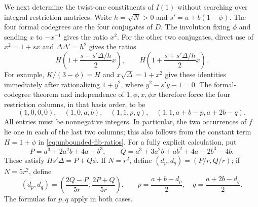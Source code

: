 We next determine the twist-one constituents of $I(1)$ without searching
over integral restriction matrices. Write $h=\sqrt N>0$ and
$s'=a+b(1-\phi)$. The four formal codegrees are the four conjugates of
$D$. The involution fixing $\phi$ and sending $x$ to $-x^{-1}$ gives
the ratio $x^2$. For the other two conjugates, direct use of
$x^2=1+sx$ and $\Delta\Delta'=h^2$ gives the ratios
\begin{equation}\label{eq:unbounded-fib-ratios}
 H\left(1+\frac{s-s'\Delta/h}{2}x\right),\qquad
 H\left(1+\frac{s+s'\Delta/h}{2}x\right).
\end{equation}
For example, $K/(3-\phi)=H$ and
$x\sqrt\Delta=1+x^2$ give these identities immediately after
rationalizing $1+y^2$, where $y^2-s'y-1=0$.
The formal-codegree theorem and independence of $1,\phi,x,\phi x$
therefore force the four restriction columns, in that basis order, to be
\begin{equation}\label{eq:unbounded-fib-columns}
 (1,0,0,0),\quad (1,0,a,b),\quad
 (1,1,p,q),\quad(1,1,a+b-p,a+2b-q).
\end{equation}
All entries must be nonnegative integers. In particular, the two
occurrences of $f$ lie one in each of the last two columns; this also
follows from the constant term $H=1+\phi$ in
\eqref{eq:unbounded-fib-ratios}.
For a fully explicit calculation, put
\[
 P=a^3+2a^2b+4a-b^3,\qquad
 Q=a^3+3a^2b+ab^2+4a-2b^3-4b.
\]
These satisfy $Hs'\Delta=P+Q\phi$. If $N=r^2$, define
$(d_p,d_q)=(P/r,Q/r)$; if $N=5r^2$, define
\begin{equation}\label{eq:unbounded-fib-pq}
 (d_p,d_q)=\left(\frac{2Q-P}{5r},\frac{2P+Q}{5r}\right).
 \qquad
 p=\frac{a+b-d_p}{2},\quad q=\frac{a+2b-d_q}{2}.
\end{equation}
The formulas for $p,q$ apply in both cases.

